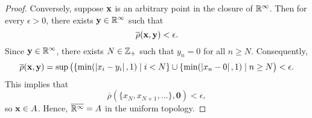 \begin{solution}
\begin{proof}
    Conversely, suppose $\mathbf{x}$ is an arbitrary point in the closure of $\mathbb{R}^\infty$.
    Then for every $\epsilon > 0$, there exists $\mathbf{y} \in \mathbb{R}^\infty$ such that
    \begin{equation*}
      \overline{\rho}(\mathbf{x}, \mathbf{y}) < \epsilon.
    \end{equation*}
    Since $\mathbf{y} \in \mathbb{R}^\infty$, there exists $N \in \mathbb{Z}_+$ such that $y_n = 0$ for all $n \geq N$.
    Consequently,
    \begin{equation*}
      \overline{\rho}(\mathbf{x}, \mathbf{y}) = \sup\big( \{ \min(\left| x_i - y_i \right|, 1) \mid i < N \} \cup \{ \min(\left| x_n - 0 \right|, 1) \mid n \geq N \big) < \epsilon.
    \end{equation*}
    This implies that
    \begin{equation*}
      \overline{\rho}(\{ x_N, x_{N+1}, \ldots \}, \mathbf{0}) < \epsilon,
    \end{equation*}
    so $\mathbf{x} \in A$.
    Hence, $\overline{\mathbb{R}^\infty} = A$ in the uniform topology.
  \end{proof}
\end{solution}
\newpage

